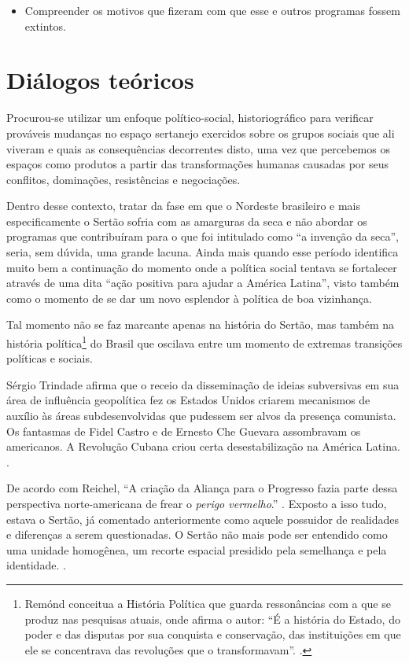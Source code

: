\begin{refsection}
\begin{itemize}
        \item Compreender os motivos que fizeram com que esse e outros programas fossem extintos. 
    \end{itemize}

    \section{Diálogos teóricos}

    Procurou-se utilizar um enfoque político-social, historiográfico para verificar prováveis mudanças no espaço sertanejo exercidos sobre os grupos sociais que ali viveram e quais as consequências decorrentes disto, uma vez que percebemos os espaços como produtos a partir das transformações humanas causadas por seus conflitos, dominações, resistências e negociações. 

    Dentro desse contexto, tratar da fase em que o Nordeste brasileiro e mais especificamente o Sertão sofria com as amarguras da seca e não abordar os programas que contribuíram para o que foi intitulado como ``a invenção da seca'', seria, sem dúvida, uma grande lacuna. Ainda mais quando esse período identifica muito bem a continuação do momento onde a política social tentava se fortalecer através de uma dita ``ação positiva para ajudar a América Latina'', visto também como o momento de se dar um novo esplendor à política de boa vizinhança. 

    Tal momento não se faz marcante apenas na história do Sertão, mas também na história política\footnote{Remónd conceitua a História Política que guarda ressonâncias com a que se produz nas pesquisas atuais, onde afirma o autor: ``É a história do Estado, do poder e das disputas por sua conquista e conservação, das instituições em que ele se concentrava das revoluções que o transformavam''. \cite[p.~15]{Remond2003Historia}.} do Brasil que oscilava entre um momento de extremas transições políticas e sociais. 

    Sérgio Trindade afirma que o receio da disseminação de ideias subversivas em sua área de influência geopolítica fez os Estados Unidos criarem mecanismos de auxílio às áreas subdesenvolvidas que pudessem ser alvos da presença comunista. Os fantasmas de Fidel Castro e de Ernesto Che Guevara assombravam os americanos. A Revolução Cubana criou certa desestabilização na América Latina. \cite[p.~198--199]{Trindade2004Aluizio}. 

    De acordo com Reichel, ``A criação da Aliança para o Progresso fazia parte dessa perspectiva norte-americana de frear o \textit{perigo vermelho}.'' \cite[p.~189--208]{Reichel2004Perigo}. Exposto a isso tudo, estava o Sertão, já comentado anteriormente como aquele possuidor de realidades e diferenças a serem questionadas. O Sertão não mais pode ser entendido como uma unidade homogênea, um recorte espacial presidido pela semelhança e pela identidade. \cite[p.~41--42]{AlbuquerqueJr2014Distante}. 


\end{refsection}
